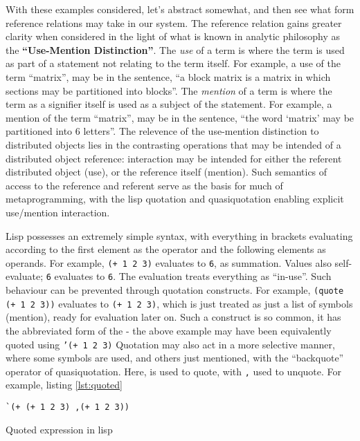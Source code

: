 With these examples considered, let's abstract somewhat, and then see
what form reference relations may take in our system. The reference
relation gains greater clarity when considered in the light of what is
known in analytic philosophy as the \textbf{``Use-Mention
    Distinction''}. The \emph{use} of a term is where the term is used as
part of a statement not relating to the term itself. For example, a use
of the term ``matrix'', may be in the sentence, ``a block matrix is a
matrix in which sections may be partitioned into blocks''. The
\emph{mention} of a term is where the term as a signifier itself is used
as a subject of the statement. For example, a mention of the term
``matrix'', may be in the sentence, ``the word `matrix' may be
partitioned into 6 letters''. The relevence of the use-mention
distinction to distributed objects lies in the contrasting operations
that may be intended of a distributed object reference: interaction may
be intended for either the referent distributed object (use), or the
reference itself (mention). Such semantics of access to the reference
and referent serve as the basis for much of metaprogramming, with the
lisp quotation and quasiquotation enabling explicit use/mention
interaction.

Lisp possesses an extremely simple syntax, with everything in brackets
evaluating according to the first element as the operator and the
following elements as operands. For example, \texttt{(+ 1 2 3)}
evaluates to \texttt{6}, as summation. Values also self-evaluate;
\texttt{6} evaluates to \texttt{6}. The evaluation treats everything as
``in-use''. Such behaviour can be prevented through quotation
constructs. For example, \texttt{(quote (+ 1 2 3))} evaluates to
\texttt{(+ 1 2 3)}, which is just treated as just a list of symbols
(mention), ready for evaluation later on. Such a construct is so common,
it has the abbreviated form of the \texttt{\textquotesingle{}} - the
above example may have been equivalently quoted using
\texttt{'(+ 1 2 3)} Quotation may also act in a
more selective manner, where some symbols are used, and others just
mentioned, with the ``backquote'' operator of quasiquotation. Here,
\texttt{\textasciigrave{}} is used to quote, with \texttt{,} used to
unquote. For example, listing \cref{lst:quoted}

\begin{listing}
    \begin{verbatim}
`(+ (+ 1 2 3) ,(+ 1 2 3))
    \end{verbatim}
    \caption{Quoted expression in lisp}
    \label{lst:quoted}
\end{listing}


